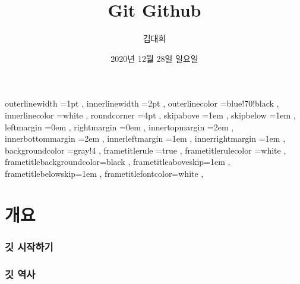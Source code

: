 \documentclass[12pt, a4paper, oneside]{book}
\let\stdsection\section
\renewcommand\section{\newpage\stdsection}
\begin{document}
	
			\dominitoc
			\doparttoc			


			\title{ Git Github  }
			\author{김대희}
			\date{ 	2020년 
					12월 
					28일
					일요일
						}
			\maketitle


			\tableofcontents 		%
			\cleardoublepage
			\listoftables 			%





		 {
						outerlinewidth		=1pt			,%
						innerlinewidth		=2pt			,%
						outerlinecolor		=blue!70!black	,%
						innerlinecolor		=white 			,%
						roundcorner			=4pt			,%
						skipabove			=1em 			,%
						skipbelow			=1em 			,%
						leftmargin			=0em			,%
						rightmargin			=0em			,%
						innertopmargin		=2em 			,%
						innerbottommargin 	=2em 			,%
						innerleftmargin		=1em 			,%
						innerrightmargin		=1em 			,%
						backgroundcolor		=gray!4			,%
						frametitlerule		=true 			,%
						frametitlerulecolor	=white			,%
						frametitlebackgroundcolor=black		,%
						frametitleaboveskip=1em 			,%
						frametitlebelowskip=1em 			,%
						frametitlefontcolor=white 			,%
						}


%


	\part{ 개요  }
	\noptcrule
	\parttoc				

%										
	\section{ 깃 시작하기 }


%										
	\section{ 깃 역사}
\end{document}
